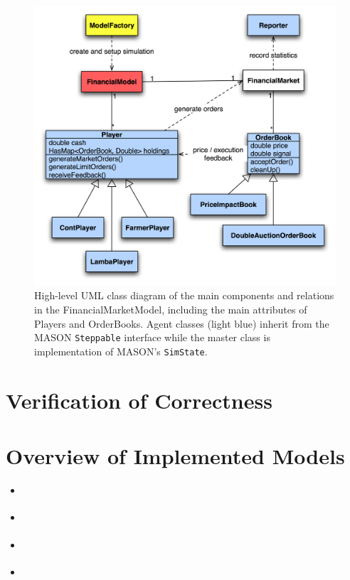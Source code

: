 \documentclass[runningheads]{llncs}
\begin{document}
\begin{figure}[htb]
\centering
\includegraphics[width=1.0\textwidth]{../graphics/masterClassDiagram.jpg}
\caption{High-level UML class diagram of the main components and relations in the FinancialMarketModel, including the main attributes of Players and OrderBooks. Agent classes (light blue) inherit from the MASON \texttt{Steppable} interface while the master class is implementation of MASON's \texttt{SimState}.}
\label{fig:general_uml}
\end{figure}

\section{Verification of Correctness}

\section{Overview of Implemented Models}

\begin{itemize}
	\item \cite{farmer2003}
	\item \cite{lamba2007}
	\item \cite{westerhoff2004}
	\item \cite{cont2006}
\end{itemize}



\end{document}
